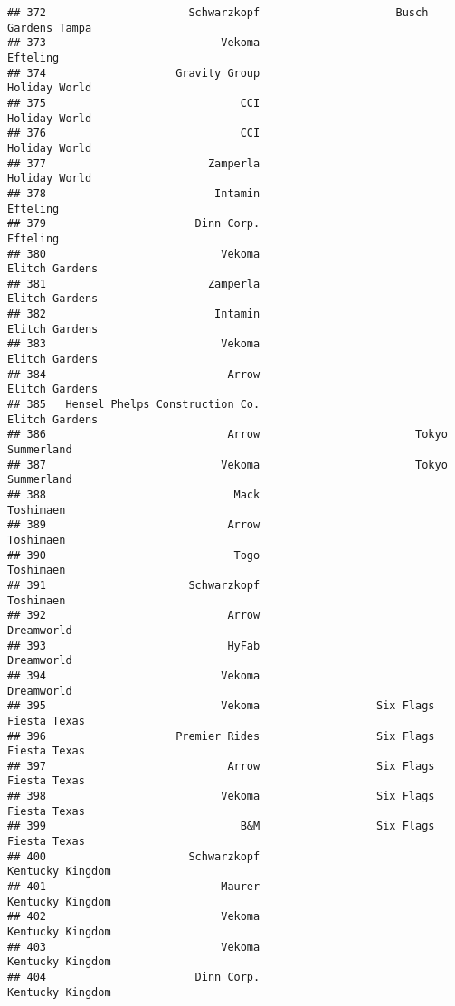 \documentclass[
]{article}
\begin{document}
\begin{verbatim}
## 372                      Schwarzkopf                     Busch Gardens Tampa
## 373                           Vekoma                                Efteling
## 374                    Gravity Group                           Holiday World
## 375                              CCI                           Holiday World
## 376                              CCI                           Holiday World
## 377                         Zamperla                           Holiday World
## 378                          Intamin                                Efteling
## 379                       Dinn Corp.                                Efteling
## 380                           Vekoma                          Elitch Gardens
## 381                         Zamperla                          Elitch Gardens
## 382                          Intamin                          Elitch Gardens
## 383                           Vekoma                          Elitch Gardens
## 384                            Arrow                          Elitch Gardens
## 385   Hensel Phelps Construction Co.                          Elitch Gardens
## 386                            Arrow                        Tokyo Summerland
## 387                           Vekoma                        Tokyo Summerland
## 388                             Mack                               Toshimaen
## 389                            Arrow                               Toshimaen
## 390                             Togo                               Toshimaen
## 391                      Schwarzkopf                               Toshimaen
## 392                            Arrow                              Dreamworld
## 393                            HyFab                              Dreamworld
## 394                           Vekoma                              Dreamworld
## 395                           Vekoma                  Six Flags Fiesta Texas
## 396                    Premier Rides                  Six Flags Fiesta Texas
## 397                            Arrow                  Six Flags Fiesta Texas
## 398                           Vekoma                  Six Flags Fiesta Texas
## 399                              B&M                  Six Flags Fiesta Texas
## 400                      Schwarzkopf                        Kentucky Kingdom
## 401                           Maurer                        Kentucky Kingdom
## 402                           Vekoma                        Kentucky Kingdom
## 403                           Vekoma                        Kentucky Kingdom
## 404                       Dinn Corp.                        Kentucky Kingdom

\end{verbatim}
\end{document}

